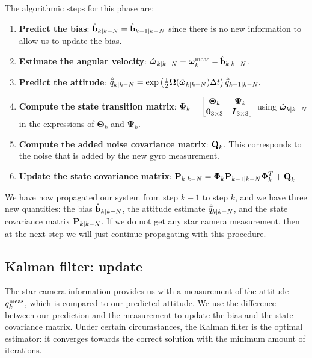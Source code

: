 The algorithmic steps for this phase are:
\begin{enumerate}
\item \textbf{Predict the bias}: $\hat{\textrm{\textbf{b}}}_{k|k-N} = \hat{\textrm{\textbf{b}}}_{k-1|k-N}$ since there is no new information to allow us to update the bias.
\item \textbf{Estimate the angular velocity}: $\hat{\boldsymbol\omega}_{k|k-N} = \boldsymbol\omega_k^{\textrm{meas}} - \hat{\textrm{\textbf{b}}}_{k|k-N}$.
\item \textbf{Predict the attitude}: $\hat{\bar{q}}_{k|k-N} = \exp\left(\frac{1}{2}\boldsymbol\Omega(\hat{\boldsymbol\omega}_{k|k-N})\Delta t\right)\hat{\bar{q}}_{k-1|k-N}.$
\item \textbf{Compute the state transition matrix}: $\boldsymbol{\Phi}_k = \begin{bmatrix} \boldsymbol{\Theta}_k & \boldsymbol{\Psi}_k \\ \boldsymbol{0}_{3\times 3} & \boldsymbol{I}_{3\times 3}\end{bmatrix}$ using $\hat{\boldsymbol\omega}_{k|k-N}$ in the expressions of $\boldsymbol{\Theta}_k$ and $\boldsymbol{\Psi}_k$.
\item \textbf{Compute the added noise covariance matrix}: $\textrm{\textbf{Q}}_k$. This corresponds to the noise that is added by the new gyro measurement.
\item \textbf{Update the state covariance matrix}: $\textrm{\textbf{P}}_{k|k-N}  =   \boldsymbol{\Phi}_k \textrm{\textbf{P}}_{k-1|k-N}\boldsymbol{\Phi}^T_k + \textrm{\textbf{Q}}_k$
\end{enumerate}
We have now propagated our system from step $k-1$ to step $k$, and we have three new quantities: the bias $\hat{\textrm{\textbf{b}}}_{k|k-N}$, the attitude estimate $\hat{\bar{q}}_{k|k-N}$, and the state covariance matrix $\textrm{\textbf{P}}_{k|k-N} $. If we do not get any star camera measurement, then at the next step we will just continue propagating with this procedure.

\subsection{Kalman filter: update}
\label{subsec:EKFUpdate}

The star camera information provides us with a measurement of the attitude $\bar{q}^{\textrm{meas}}_{k}$, which is compared to our predicted attitude. We use the difference between our prediction and the measurement to update the bias and the state covariance matrix. Under certain circumstances, the Kalman filter is the optimal estimator: it converges towards the correct solution with the minimum amount of iterations.

